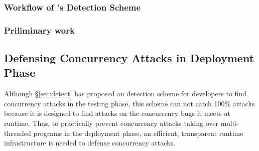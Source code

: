 \subsubsection{Workflow of \xxx's Detection Scheme}\label{sec:detect-arch}





 

\subsubsection{Priliminary work}\label{sec:detect-result}


\subsection{Defensing Concurrency Attacks in Deployment Phase} 
\label{sec:defense}

Although \S\ref{sec:detect} has proposed an detection scheme for developers to 
find concurrency attacks in the testing phase, this scheme can not catch 100\% 
attacks because it is designed to find attacks on the concurrency bugs it meets 
at runtime. Thus, to practically prevent concurrency attacks taking over 
multi-threaded programs in the deployment phase, an efficient, transparent 
runtime infrastructure is needed to defense concurrency attacks.

